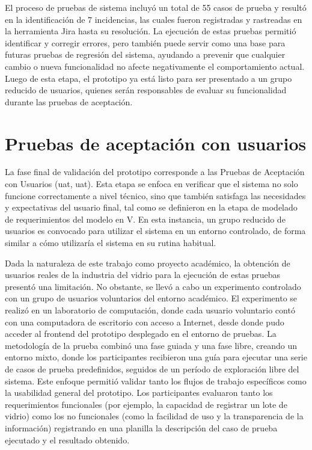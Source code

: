 El proceso de pruebas de sistema incluyó un total de 55 casos de prueba y resultó en la identificación de 7 incidencias, las cuales fueron registradas y rastreadas en la herramienta Jira hasta su resolución. La ejecución de estas pruebas permitió identificar y corregir errores, pero también puede servir como una base para futuras pruebas de regresión del sistema, ayudando a prevenir que cualquier cambio o nueva funcionalidad no afecte negativamente el comportamiento actual. Luego de esta etapa, el prototipo ya está listo para ser presentado a un grupo reducido de usuarios, quienes serán responsables de evaluar su funcionalidad durante las pruebas de aceptación.

\section{Pruebas de aceptación con usuarios}
\label{sec:user-acceptance-testing}

La fase final de validación del prototipo corresponde a las Pruebas de Aceptación con Usuarios (\acrshort{uat}, \acrlong{uat}). Esta etapa se enfoca en verificar que el sistema no solo funcione correctamente a nivel técnico, sino que también satisfaga las necesidades y expectativas del usuario final, tal como se definieron en la etapa de modelado de requerimientos del modelo en V. En esta instancia, un grupo reducido de usuarios es convocado para utilizar el sistema en un entorno controlado, de forma similar a cómo utilizaría el sistema en su rutina habitual. 

Dada la naturaleza de este trabajo como proyecto académico, la obtención de usuarios reales de la industria del vidrio para la ejecución de estas pruebas presentó una limitación. No obstante, se llevó a cabo un experimento controlado con un grupo de usuarios voluntarios del entorno académico. El experimento se realizó en un laboratorio de computación, donde cada usuario voluntario contó con una computadora de escritorio con acceso a Internet, desde donde pudo acceder al \gls{frontend} del prototipo desplegado en el entorno de pruebas. La metodología de la prueba combinó una fase guiada y una fase libre, creando un entorno mixto, donde los participantes recibieron una guía para ejecutar una serie de casos de prueba predefinidos, seguidos de un período de exploración libre del sistema. Este enfoque permitió validar tanto los flujos de trabajo específicos como la usabilidad general del prototipo. Los participantes evaluaron tanto los requerimientos funcionales (por ejemplo, la capacidad de registrar un lote de vidrio) como los no funcionales (como la facilidad de uso y la transparencia de la información) registrando en una planilla la descripción del caso de prueba ejecutado y el resultado obtenido.

